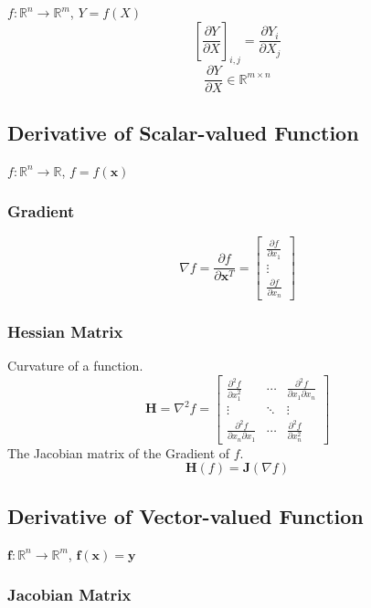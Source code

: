 \documentclass{article}
\begin{document}
$f: \mathbb{R}^n \to \mathbb{R}^m$, $Y = f(X)$
\[
    \left[\frac{\partial Y}{\partial X}\right]_{i,j} = \frac{\partial Y_{i}}{\partial X_{j}}
\]
\[
    \frac{\partial Y}{\partial X} \in \mathbb{R}^{m\times n}
\]


\subsection{Derivative of Scalar-valued Function}

$f: \mathbb{R}^n \to \mathbb{R}$, $f = f(\mathbf{x})$

\subsubsection{Gradient}

\[
    \nabla f = \frac{\partial f}{\partial \mathbf{x}^T} =
    \begin{bmatrix}
        \frac{\partial f}{\partial x_1} \\
        \vdots \\
        \frac{\partial f}{\partial x_n}
    \end{bmatrix}
\]

\subsubsection{Hessian Matrix}
Curvature of a function.
\[
    \mathbf{H} = \nabla^2 f =
    \begin{bmatrix}
        \frac{\partial^2 f}{\partial x_1^2} & \cdots & \frac{\partial^2 f}{\partial x_1 \partial x_n} \\
        \vdots & \ddots & \vdots \\
        \frac{\partial^2 f}{\partial x_n \partial x_1} & \cdots & \frac{\partial^2 f}{\partial x_n^2}
    \end{bmatrix}
\]
The Jacobian matrix of the Gradient of $f$.
\[
    \mathbf{H}(f) = \mathbf{J}(\nabla f)
\]

\subsection{Derivative of Vector-valued Function}

$\mathbf{f}: \mathbb{R}^n \to \mathbb{R}^m$, $\mathbf{f}(\mathbf{x}) = \mathbf{y}$

\subsubsection{Jacobian Matrix}
\end{document}
